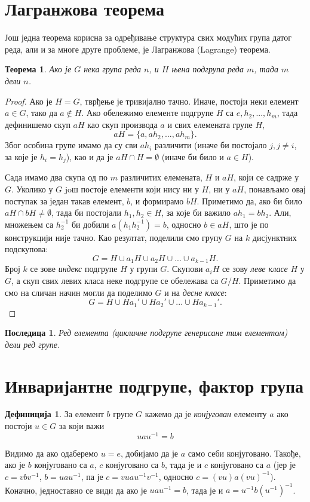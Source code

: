 \documentclass{report}
\theoremstyle{plain}
\newtheorem{thm}{Теорема}
\newtheorem*{cor}{Последица}
\theoremstyle{definition}
\newtheorem*{defn}{Дефиниција}
\begin{document}
\section{Лагранжова теорема}
Још једна теорема корисна за одређивање структура свих модућих група датог реда, али и за многе друге проблеме, је Лагранжова (Lagrange) теорема.
\begin{thm}
Ако је $G$ нека група реда $n$, и $H$ њена подгрупа реда $m$, тада $m$ дели $n$.
\end{thm}
\begin{proof}
Ако је $H=G$, тврђење је тривијално тачно. Иначе, постоји неки елемент $a\in G$, тако да $a\notin H$. Ако обележимо елементе подгрупе $H$ са $e, h_2, ..., h_m$, тада дефинишемо скуп $aH$ као скуп производа $a$ и свих елемената групе $H$,
$$aH = \{a, ah_2, ..., ah_m\}.$$
Због особина групе имамо да су сви $ah_i$ различити (иначе би постојало $j, j\neq i$, за које је $h_i=h_j$), као и да је $aH\cap H = \emptyset$ (иначе би било и $a\in H$).

Сада имамо два скупа од по $m$ различитих елемената, $H$ и $aH$, који се садрже у $G$. Уколико у $G$ joш постоје елементи који нису ни у $H$, ни у $aH$, понављамо овај поступак за један такав елемент, $b$, и формирамо $bH$. Приметимо да, ако би било $aH\cap bH \not= \emptyset$, тада би постојали $h_1, h_2\in H$, за које би важило $ah_1 = bh_2$. Али, множењем са $h_2^{-1}$ би добили $a(h_1h_2^{-1}) = b$, односно $b\in aH$, што је по конструкцији није тачно. Као резултат, поделили смо групу $G$ на $k$ дисјунктних подскупова:
$$G = H \cup a_1 H \cup a_2 H \cup ... \cup a_{k-1} H.$$
Број $k$ се зове \emph{индекс} подгрупе $H$ у групи $G$. Скупови $a_i H$ се зову \emph{леве класе} $H$ у $G$, а скуп свих левих класа неке подгрупе се обележава са $G/H$. Приметимо да смо на сличан начин могли да поделимо $G$ и на \emph{десне класе}:
$$G = H \cup Ha_1'  \cup Ha_2' \cup ... \cup Ha_{k-1}'.$$
\end{proof}
\begin{cor}
Ред елемента (цикличне подгрупе генерисане тим елементом) дели ред групе.
\end{cor}

\section{Инваријантне подгрупе, фактор група}
\begin{defn}
За елемент $b$ групе $G$ кажемо да је \emph{конјугован} елементу $a$ ако постоји $u\in G$ за који важи
$$u a u^{-1} = b$$
\end{defn}
Видимо да ако одаберемо $u = e$, добијамо да је $a$ само себи конјуговано. Такође, ако је $b$ конјуговано са $a$, $c$ конјуговано са $b$, тада је и $c$ конјуговано са $a$ (јер је $c = vbv^{-1}$, $b = uau^{-1}$, па је $c = vuau^{-1}v^{-1}$, односно $c = (vu)a(vu)^{-1}$). Коначно, једноставно се види да ако је $u a u^{-1} = b$, тада је и $a = u^{-1} b (u^{-1})^{-1}$.
\end{document}
